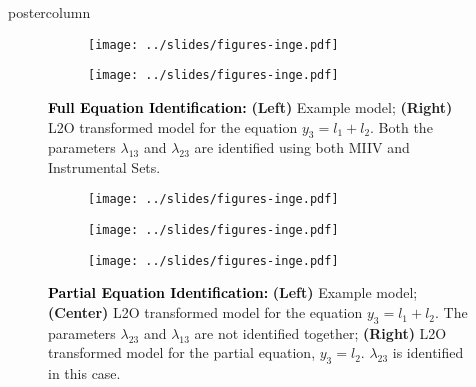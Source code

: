 \documentclass{beamer}
\begin{document}
\begin{frame}
\begin{columns}
\begin{column}{.33\textwidth}
\begin{beamercolorbox}[center]{postercolumn}
\begin{minipage}{.98\textwidth}
{\begin{myblock}{}
\begin{enumerate}
						\end{enumerate}
					\end{myblock}\vfill
					\begin{myblock}{}
						\begin{figure}
							\begin{subfigure}{0.5 \linewidth}
								\centering
								\texttt{[image: ../slides/figures-inge.pdf]}
							\end{subfigure}%
							\begin{subfigure}{0.5 \linewidth}
								\centering
								\texttt{[image: ../slides/figures-inge.pdf]}
							\end{subfigure}
							\caption*{\textbf{\textcolor{black}{Full Equation Identification:}} \textbf{(Left)} Example model; \textbf{(Right)} L2O 
										transformed model for the equation $ y_3 = l_1 + l_2 $. Both the parameters $ \lambda_{13} $ and 
										$ \lambda_{23} $ are identified using both MIIV and Instrumental Sets.}
						\end{figure}
						\vspace{0.6em}
						\begin{figure}
							\begin{subfigure}{0.33 \linewidth}
								\centering
								\texttt{[image: ../slides/figures-inge.pdf]}
							\end{subfigure}%
							\begin{subfigure}{0.33 \linewidth}
								\centering
								\texttt{[image: ../slides/figures-inge.pdf]}
							\end{subfigure}%
							\begin{subfigure}{0.33 \linewidth}
								\centering
								\texttt{[image: ../slides/figures-inge.pdf]}
							\end{subfigure}
							\caption*{\textbf{\textcolor{black}{Partial Equation Identification:}} \textbf{(Left)} Example model; 
										\textbf{(Center)} L2O transformed model for the equation $ y_3 = l_1 + l_2 $. The parameters 
										$ \lambda_{23} $ and $ \lambda_{13} $ are not identified together; \textbf{(Right)} L2O 
										transformed model for the partial equation, $ y_3 = l_2 $. $ \lambda_{23} $ is identified in this case.
										}
						\end{figure}
						\vspace{0.6em}
						\begin{figure}
							\begin{subfigure}{0.5 \linewidth}

\end{subfigure}
\end{figure}
\end{myblock}}
\end{minipage}
\end{beamercolorbox}
\end{column}
\end{columns}
\end{frame}
\end{document}
